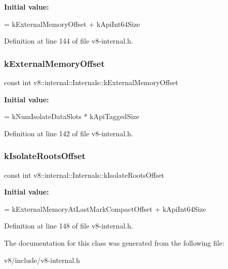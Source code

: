 {\bfseries Initial value\+:}
\begin{DoxyCode}
=
      kExternalMemoryOffset + kApiInt64Size
\end{DoxyCode}


Definition at line 144 of file v8-\/internal.\+h.

\mbox{\label{classv8_1_1internal_1_1Internals_a29ea1efa730a5108018424287556faa1}} 
\subsubsection{\texorpdfstring{k\+External\+Memory\+Offset}{kExternalMemoryOffset}}
{\footnotesize\ttfamily const int v8\+::internal\+::\+Internals\+::k\+External\+Memory\+Offset\hspace{0.3cm}{\ttfamily [static]}}

{\bfseries Initial value\+:}
\begin{DoxyCode}
=
      kNumIsolateDataSlots * kApiTaggedSize
\end{DoxyCode}


Definition at line 142 of file v8-\/internal.\+h.

\mbox{\label{classv8_1_1internal_1_1Internals_a3142f942a25203ce7fca0e9a4563c74d}} 
\subsubsection{\texorpdfstring{k\+Isolate\+Roots\+Offset}{kIsolateRootsOffset}}
{\footnotesize\ttfamily const int v8\+::internal\+::\+Internals\+::k\+Isolate\+Roots\+Offset\hspace{0.3cm}{\ttfamily [static]}}

{\bfseries Initial value\+:}
\begin{DoxyCode}
=
      kExternalMemoryAtLastMarkCompactOffset + kApiInt64Size
\end{DoxyCode}


Definition at line 148 of file v8-\/internal.\+h.



The documentation for this class was generated from the following file\+:\begin{DoxyCompactItemize}
\item 
v8/include/v8-\/internal.\+h\end{DoxyCompactItemize}
